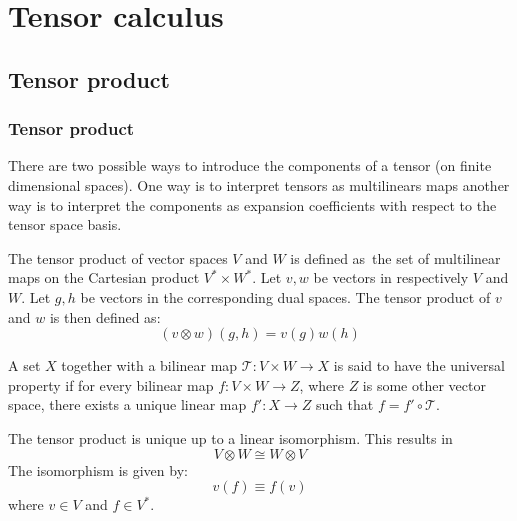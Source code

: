 \chapter{Tensor calculus}

\section{Tensor product}
\subsection{Tensor product}

	There are two possible ways to introduce the components of a tensor (on finite dimensional spaces). One way is to interpret tensors as multilinears maps another way is to interpret the components as expansion coefficients with respect to the tensor space basis.
    
	\begin{definition}\label{tensor:tensor_product}
    		The tensor product of vector spaces $V$ and $W$ is defined as\footnotemark\ the set of multilinear maps on the Cartesian product $V^*\times W^*$. Let $v, w$ be vectors in respectively $V$ and $W$. Let $g, h$ be vectors in the corresponding dual spaces. The tensor product of $v$ and $w$ is then defined as:
        	\begin{equation}
        		\boxed{(v\otimes w)(g, h) = v(g)w(h)}
	        \end{equation}
	\end{definition}
    
	\begin{property}\label{tensor:prop:universal_property}
	   	A set $X$ together with a bilinear map $\mathcal{T}:V\times W\rightarrow X$ is said to have the universal property if for every bilinear map $f:V\times W\rightarrow Z$, where $Z$ is some other vector space, there exists a unique linear map $f':X\rightarrow Z$ such that $f = f'\circ\mathcal{T}$.
	\end{property}
	\begin{result}
	    	The tensor product is unique up to a linear isomorphism. This results in
	    	\begin{equation}
			\label{tensor:prop:change}
	        	V\otimes W \cong W\otimes V
		\end{equation}
		The isomorphism is given by:
	        \begin{equation}
	        	v(f) \equiv f(v)
	        \end{equation}
	        where $v\in V$ and $f\in V^*$.
	\end{result}
    
